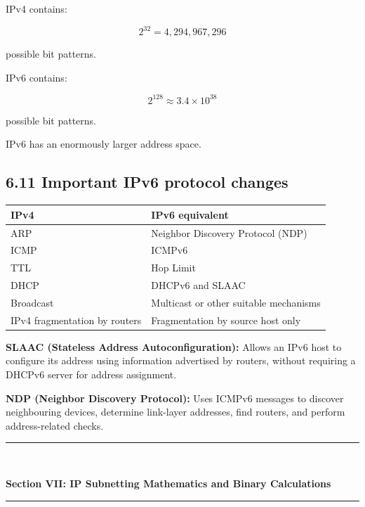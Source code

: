 IPv4 contains:


\[
2^{32}=4,294,967,296
\]


possible bit patterns.

IPv6 contains:


\[
2^{128}\approx3.4\times10^{38}
\]


possible bit patterns.

IPv6 has an enormously larger address space.

\subsection{6.11 Important IPv6 protocol changes}

\begin{table}[htbp]
\centering
\begin{tabularx}{\textwidth}{X X}
\toprule
\textbf{IPv4} & \textbf{IPv6 equivalent} \\
\midrule
ARP & Neighbor Discovery Protocol (NDP) \\
ICMP & ICMPv6 \\
TTL & Hop Limit \\
DHCP & DHCPv6 and SLAAC \\
Broadcast & Multicast or other suitable mechanisms \\
IPv4 fragmentation by routers & Fragmentation by source host only \\
\bottomrule
\end{tabularx}
\end{table}

\textbf{SLAAC (Stateless Address Autoconfiguration):} Allows an IPv6 host to configure its address using information advertised by routers, without requiring a DHCPv6 server for address assignment.

\textbf{NDP (Neighbor Discovery Protocol):} Uses ICMPv6 messages to discover neighbouring devices, determine link-layer addresses, find routers, and perform address-related checks.

\newpage

\newpage
\begin{center}
\vspace{0.5em}
{\color{primary}\rule{0.45\textwidth}{1.2pt}\\[4pt]}
{\Large\bfseries\color{primary} Section VII: IP Subnetting Mathematics and Binary Calculations\\[2pt]}
{\color{primary}\rule{0.45\textwidth}{1.2pt}}
\vspace{0.5em}
\end{center}

